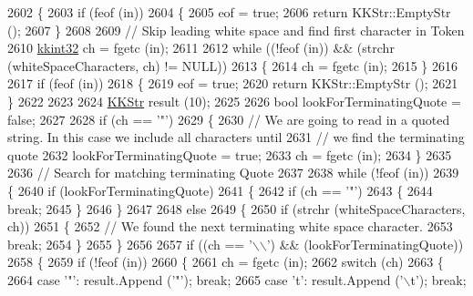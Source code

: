 \begin{DoxyCode}
2602 \{
2603   \textcolor{keywordflow}{if}  (feof (in))
2604   \{
2605     eof = \textcolor{keyword}{true};
2606     \textcolor{keywordflow}{return} KKStr::EmptyStr ();
2607   \}
2608 
2609   \textcolor{comment}{// Skip leading white space and find first character in Token}
2610   \hyperlink{namespace_k_k_b_a8fa4952cc84fda1de4bec1fbdd8d5b1b}{kkint32}  ch = fgetc (in);
2611 
2612   \textcolor{keywordflow}{while}  ((!feof (in))  &&  (strchr (whiteSpaceCharacters, ch) != NULL))
2613   \{
2614     ch = fgetc (in); 
2615   \}
2616 
2617   \textcolor{keywordflow}{if}  (feof (in))
2618   \{
2619     eof = \textcolor{keyword}{true};
2620     \textcolor{keywordflow}{return}  KKStr::EmptyStr ();
2621   \}
2622 
2623 
2624   \hyperlink{class_k_k_b_1_1_k_k_str}{KKStr}  result (10);
2625 
2626   \textcolor{keywordtype}{bool}  lookForTerminatingQuote = \textcolor{keyword}{false};
2627 
2628   \textcolor{keywordflow}{if}  (ch == \textcolor{charliteral}{'"'})
2629   \{
2630     \textcolor{comment}{// We are going to read in a quoted string.  In this case we include all characters until }
2631     \textcolor{comment}{// we find the terminating quote}
2632     lookForTerminatingQuote = \textcolor{keyword}{true};
2633     ch = fgetc (in);
2634   \}
2635 
2636   \textcolor{comment}{// Search for matching terminating Quote}
2637 
2638   \textcolor{keywordflow}{while}  (!feof (in))
2639   \{
2640     \textcolor{keywordflow}{if}  (lookForTerminatingQuote)
2641     \{
2642       \textcolor{keywordflow}{if}  (ch == \textcolor{charliteral}{'"'})
2643       \{
2644         \textcolor{keywordflow}{break};
2645       \}
2646     \}
2647 
2648     \textcolor{keywordflow}{else} 
2649     \{
2650       \textcolor{keywordflow}{if}  (strchr (whiteSpaceCharacters, ch))
2651       \{
2652         \textcolor{comment}{// We found the next terminating white space character.}
2653         \textcolor{keywordflow}{break};
2654       \}
2655     \}
2656 
2657     \textcolor{keywordflow}{if}  ((ch == \textcolor{charliteral}{'\(\backslash\)\(\backslash\)'})  &&  (lookForTerminatingQuote))
2658     \{
2659       \textcolor{keywordflow}{if}  (!feof (in))
2660       \{
2661         ch = fgetc (in);
2662         \textcolor{keywordflow}{switch}  (ch)
2663         \{
2664          \textcolor{keywordflow}{case}  \textcolor{charliteral}{'"'}: result.Append (\textcolor{charliteral}{'"'});      \textcolor{keywordflow}{break};
2665          \textcolor{keywordflow}{case}  \textcolor{charliteral}{'t'}: result.Append (\textcolor{charliteral}{'\(\backslash\)t'});     \textcolor{keywordflow}{break};

\end{DoxyCode}
